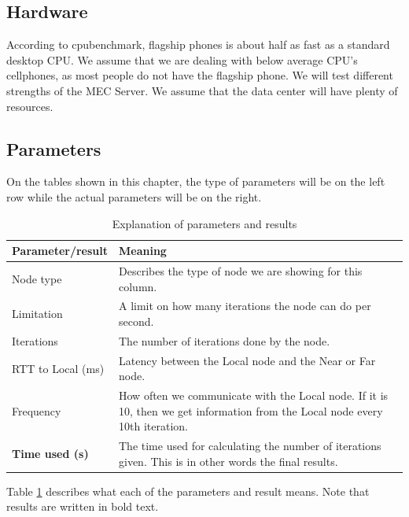 \subsection{Hardware}
According to cpubenchmark\cite{noauthor_passmark_nodate}, flagship phones is about half as fast as a standard desktop CPU. We assume that we are dealing with below average CPU's cellphones, as most people do not have the flagship phone. We will test different strengths of the MEC Server. We assume that the data center will have plenty of resources. 


\subsection{Parameters}
On the tables shown in this chapter, the type of parameters will be on the left row while the actual parameters will be on the right.
\renewcommand{\arraystretch}{1.5}
\begin{table}[h!]
    \centering
    \begin{tabular}{l|p{12cm}}
        
        Parameter/\textbf{result} &  Meaning\\
        \hline
        Node type & Describes the type of node we are showing for this column. \\

        Limitation & A limit on how many iterations the node can do per second. \\

        Iterations & The number of iterations done by the node. \\

        RTT to Local (ms) & Latency between the Local node and the Near or Far node. \\
        
        Frequency & How often we communicate with the Local node. If it is 10, then we get information from the Local node every 10th iteration. \\
        \hline
        \textbf{Time used (s)} & The time used for calculating the number of iterations given. This is in other words the final results. \\
    \end{tabular}
    \caption{Explanation of parameters and results}
    \label{tab:parameter_explanation}
\end{table}
\renewcommand{\arraystretch}{1.2}

Table \ref{tab:parameter_explanation} describes what each of the parameters and result means. Note that results are written in bold text.

